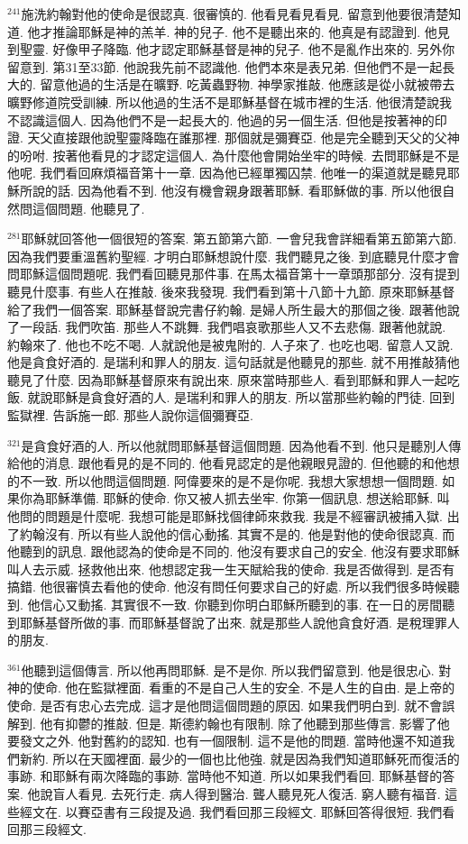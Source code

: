 \documentclass{book}
\begin{document}
$^{241}$施洗約翰對他的使命是很認真.
很審慎的.
他看見看見看見.
留意到他要很清楚知道.
他才推論耶穌是神的羔羊.
神的兒子.
他不是聽出來的.
他真是有認證到.
他見到聖靈.
好像甲子降臨.
他才認定耶穌基督是神的兒子.
他不是亂作出來的.
另外你留意到.
第31至33節.
他說我先前不認識他.
他們本來是表兄弟.
但他們不是一起長大的.
留意他過的生活是在曠野.
吃黃蟲野物.
神學家推敲.
他應該是從小就被帶去曠野修道院受訓練.
所以他過的生活不是耶穌基督在城市裡的生活.
他很清楚說我不認識這個人.
因為他們不是一起長大的.
他過的另一個生活.
但他是按著神的印證.
天父直接跟他說聖靈降臨在誰那裡.
那個就是彌賽亞.
他是完全聽到天父的父神的吩咐.
按著他看見的才認定這個人.
為什麼他會開始坐牢的時候.
去問耶穌是不是他呢.
我們看回麻煩福音第十一章.
因為他已經單獨囚禁.
他唯一的渠道就是聽見耶穌所說的話.
因為他看不到.
他沒有機會親身跟著耶穌.
看耶穌做的事.
所以他很自然問這個問題.
他聽見了.

$^{281}$耶穌就回答他一個很短的答案.
第五節第六節.
一會兒我會詳細看第五節第六節.
因為我們要重溫舊約聖經.
才明白耶穌想說什麼.
我們聽見之後.
到底聽見什麼才會問耶穌這個問題呢.
我們看回聽見那件事.
在馬太福音第十一章頭那部分.
沒有提到聽見什麼事.
有些人在推敲.
後來我發現.
我們看到第十八節十九節.
原來耶穌基督給了我們一個答案.
耶穌基督說完書仔約翰.
是婦人所生最大的那個之後.
跟著他說了一段話.
我們吹笛.
那些人不跳舞.
我們唱哀歌那些人又不去悲傷.
跟著他就說.
約翰來了.
他也不吃不喝.
人就說他是被鬼附的.
人子來了.
也吃也喝.
留意人又說.
他是貪食好酒的.
是瑞利和罪人的朋友.
這句話就是他聽見的那些.
就不用推敲猜他聽見了什麼.
因為耶穌基督原來有說出來.
原來當時那些人.
看到耶穌和罪人一起吃飯.
就說耶穌是貪食好酒的人.
是瑞利和罪人的朋友.
所以當那些約翰的門徒.
回到監獄裡.
告訴施一郎.
那些人說你這個彌賽亞.

$^{321}$是貪食好酒的人.
所以他就問耶穌基督這個問題.
因為他看不到.
他只是聽別人傳給他的消息.
跟他看見的是不同的.
他看見認定的是他親眼見證的.
但他聽的和他想的不一致.
所以他問這個問題.
阿偉要來的是不是你呢.
我想大家想想一個問題.
如果你為耶穌準備.
耶穌的使命.
你又被人抓去坐牢.
你第一個訊息.
想送給耶穌.
叫他問的問題是什麼呢.
我想可能是耶穌找個律師來救我.
我是不經審訊被捕入獄.
出了約翰沒有.
所以有些人說他的信心動搖.
其實不是的.
他是對他的使命很認真.
而他聽到的訊息.
跟他認為的使命是不同的.
他沒有要求自己的安全.
他沒有要求耶穌叫人去示威.
拯救他出來.
他想認定我一生天賦給我的使命.
我是否做得到.
是否有搞錯.
他很審慎去看他的使命.
他沒有問任何要求自己的好處.
所以我們很多時候聽到.
他信心又動搖.
其實很不一致.
你聽到你明白耶穌所聽到的事.
在一日的房間聽到耶穌基督所做的事.
而耶穌基督說了出來.
就是那些人說他貪食好酒.
是稅理罪人的朋友.

$^{361}$他聽到這個傳言.
所以他再問耶穌.
是不是你.
所以我們留意到.
他是很忠心.
對神的使命.
他在監獄裡面.
看重的不是自己人生的安全.
不是人生的自由.
是上帝的使命.
是否有忠心去完成.
這才是他問這個問題的原因.
如果我們明白到.
就不會誤解到.
他有抑鬱的推敲.
但是.
斯德約翰也有限制.
除了他聽到那些傳言.
影響了他要發文之外.
他對舊約的認知.
也有一個限制.
這不是他的問題.
當時他還不知道我們新約.
所以在天國裡面.
最少的一個也比他強.
就是因為我們知道耶穌死而復活的事跡.
和耶穌有兩次降臨的事跡.
當時他不知道.
所以如果我們看回.
耶穌基督的答案.
他說盲人看見.
去死行走.
病人得到醫治.
聾人聽見死人復活.
窮人聽有福音.
這些經文在.
以賽亞書有三段提及過.
我們看回那三段經文.
耶穌回答得很短.
我們看回那三段經文.
\end{document}
